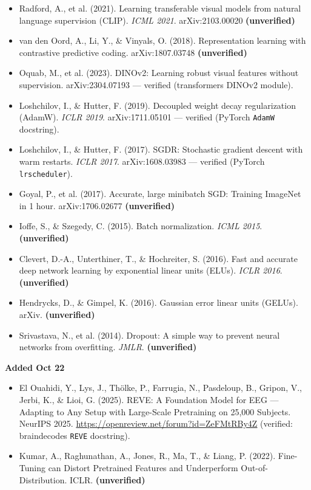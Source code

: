 \documentclass[
  11pt,
]{article}
\providecommand{\tightlist}{%
  \setlength{\itemsep}{0pt}\setlength{\parskip}{0pt}}
\renewcommand{\_}{\oldunderscore\allowbreak}
\begin{document}
\begin{itemize}
\tightlist
\item
  Radford, A., et al. (2021). Learning
  transferable visual models from
  natural language supervision (CLIP).
  \emph{ICML 2021}. arXiv:2103.00020
  \textbf{(unverified)}
\item
  van den Oord, A., Li, Y., \& Vinyals,
  O. (2018). Representation learning
  with contrastive predictive coding.
  arXiv:1807.03748 \textbf{(unverified)}
\item
  Oquab, M., et al. (2023). DINOv2:
  Learning robust visual features
  without supervision. arXiv:2304.07193
  --- verified
  (transformers\textquotesingle{} DINOv2
  module).
\item
  Loshchilov, I., \& Hutter, F. (2019).
  Decoupled weight decay regularization
  (AdamW). \emph{ICLR 2019}.
  arXiv:1711.05101 --- verified (PyTorch
  \texttt{AdamW} docstring).
\item
  Loshchilov, I., \& Hutter, F. (2017).
  SGDR: Stochastic gradient descent with
  warm restarts. \emph{ICLR 2017}.
  arXiv:1608.03983 --- verified (PyTorch
  \texttt{lr\_scheduler}).
\item
  Goyal, P., et al. (2017). Accurate,
  large minibatch SGD: Training ImageNet
  in 1 hour. arXiv:1706.02677
  \textbf{(unverified)}
\item
  Ioffe, S., \& Szegedy, C. (2015).
  Batch normalization. \emph{ICML 2015}.
  \textbf{(unverified)}
\item
  Clevert, D.-A., Unterthiner, T., \&
  Hochreiter, S. (2016). Fast and
  accurate deep network learning by
  exponential linear units (ELUs).
  \emph{ICLR 2016}.
  \textbf{(unverified)}
\item
  Hendrycks, D., \& Gimpel, K. (2016).
  Gaussian error linear units (GELUs).
  arXiv. \textbf{(unverified)}
\item
  Srivastava, N., et al. (2014).
  Dropout: A simple way to prevent
  neural networks from overfitting.
  \emph{JMLR}. \textbf{(unverified)}
\end{itemize}

\textbf{Added Oct 22}

\begin{itemize}
\tightlist
\item
  El Ouahidi, Y., Lys, J., Thölke, P.,
  Farrugia, N., Pasdeloup, B., Gripon,
  V., Jerbi, K., \& Lioi, G. (2025).
  REVE: A Foundation Model for EEG ---
  Adapting to Any Setup with Large-Scale
  Pretraining on 25,000 Subjects.
  NeurIPS 2025.
  \url{https://openreview.net/forum?id=ZeFMtRBy4Z}
  (verified:
  braindecode\textquotesingle s
  \texttt{REVE} docstring).
\item
  Kumar, A., Raghunathan, A., Jones, R.,
  Ma, T., \& Liang, P. (2022).
  Fine-Tuning can Distort Pretrained
  Features and Underperform
  Out-of-Distribution. ICLR.
  \textbf{(unverified)}
\end{itemize}
\end{document}

